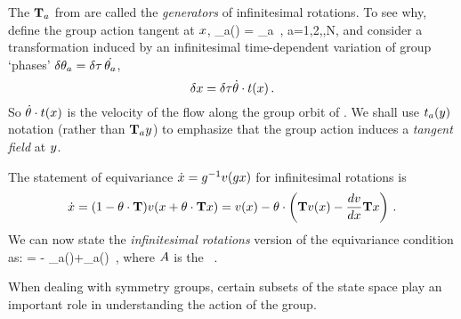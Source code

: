 {The $\mathbf{T}_a$ from  are called the \emph{generators} of infinitesimal rotations. To see why, define the group action tangent at $x$,
\beq
 \groupTan_{a}(\ssp) = \Lg _{a} \ssp
    \,,\qquad
 a=1,2,\cdots,N,
and consider a transformation induced by an infinitesimal
time-dependent variation of group `phases'
$\delta \gSpace_a = \timeStep \, \dot{\gSpace_a}$,
\[
\delta \ssp = \timeStep \dot{\gSpace} \cdot \groupTan(\ssp)
\,.
\]
So $\dot{{\bf \theta}} \cdot t(x)$ is the velocity
of the flow along the group orbit of \ssp.
We shall use $t_a(y)$ notation (rather than
$\mathbf{T}_{a}y$) to emphasize that the group action
induces a \emph{tangent field} at $y$.

The statement of equivariance
$
\dot{x}=g^{-1} v(g x)
$
for infinitesimal rotations is
\[
\dot{x}=(1-{\bf \theta} \cdot \mathbf{T} ) v(x+{\bf \theta} \cdot \mathbf{T}  x)
       =v(x)-{\bf \theta} \cdot \left(
            \mathbf{T} v(x) - \frac{dv}{dx} \mathbf{T} x
                     \right)
\,.
\]
We can now state the {\em infinitesimal
rotations} version of the equivariance condition
 as:
 = - \groupTan_{a}(\vel)+\Mvar \groupTan_{a}(\ssp)
\,,
\label{eq:InfnmslRot}
\eeq
where $A$ is the \stabmat\ .


When dealing with symmetry groups, certain subsets of the state space play an important role in understanding the action of the group.

}
